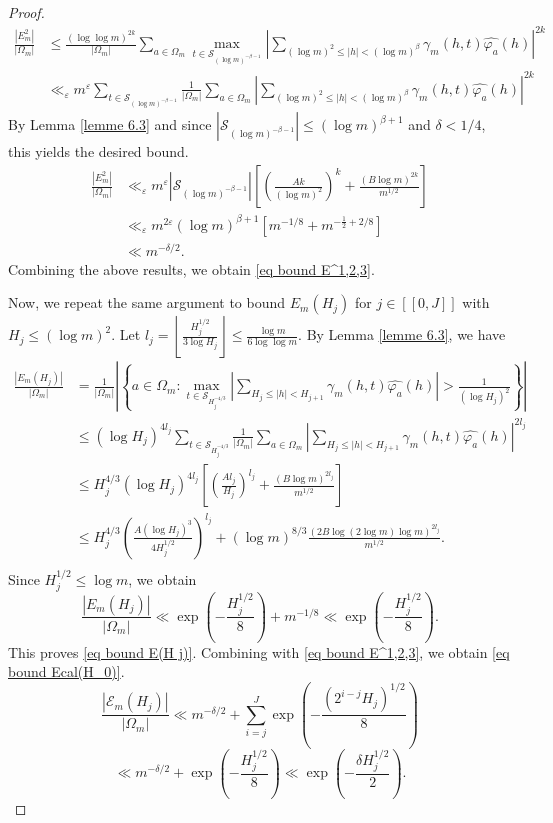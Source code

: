 \documentclass[12pt]{amsart}
\theoremstyle{definition}
\numberwithin{equation}{section}
\numberwithin{equation}{section}
\def\Ecal{\mathcal{E}}
\def\Scal{\mathcal{S}}
\begin{document}
\begin{proof}
\begin{align*}
\frac{| E^2_m|}{|\Omega_m|}
&\leq \frac{(\log\log m)^{2k}}{|\Omega_m|}
\sum_{a\in \Omega_m}
\max _{t\in \Scal_{(\log m)^{-\beta-1}}}\left|
\sum_{(\log m)^{2}\leq |h|< (\log m)^{\beta}}
\gamma_m(h,t)\widehat{\varphi_a}(h)
\right|^{2k} \\
&\ll_\varepsilon m^\varepsilon \sum_{t\in \Scal_{(\log m)^{-\beta-1}}} \frac{1}{|\Omega_m|}\sum_{a\in \Omega_m}
\left|
\sum_
{(\log m)^{2}\leq |h|< (\log m)^{\beta}}
\gamma_m(h,t)\widehat{\varphi_a}(h)
\right|^{2k}
\end{align*}
By Lemma \ref{lemme 6.3} and since \( |\Scal_{(\log m)^{-\beta-1}}| \leq (\log m)^{\beta+1} \) and \(\delta < 1/4\), this yields the desired bound.
\begin{align*}
\frac{| E^2_m|}{|\Omega_m|}
&\ll_\varepsilon m^\varepsilon |\Scal_{(\log m)^{-\beta-1}}|
\left[ 
\left(
\frac{A k}{(\log m)^{2}}
\right)^k
+\frac{(B\log m)^{2k}}{m^{1/2}}\right] \\
&
\ll_\varepsilon m^{2\varepsilon} (\log m)^{\beta+1}
\left[m^{-1/8}+m^{-\frac{1}{2}+2/8}
\right] \\
&\ll m^{-\delta/2}.
\end{align*}
Combining the above results, we obtain \eqref{eq bound E^1,2,3}.

Now, we repeat the same argument to bound $E_m(H_j)$ for $ j \in [\![ 0,J ]\!]  $ with $H_j\leq (\log m)^2.$ Let 
$ l_j = \left\lfloor\frac{H_j^{1/2}}{3\log H_j}
\right\rfloor\leq \frac{\log m}{6\log\log m}.$ By Lemma \ref{lemme 6.3}, we have
\begin{align*}
\frac{| E_m(H_j)|}{|\Omega_m|} &= 
\frac{1}{|\Omega_m|}\left| \left\{
a \in  \Omega_m: 
\max _{t\in \Scal_{H_j^{-4/3}}} 
\left|\sum_{H_j \leq |h|< H_{j+1}} \gamma_m(h,t)\widehat{\varphi_a}(h)\right|
> \frac{1}{(\log H_j)^2}
\right\}\right|
\\
&\leq 
(\log H_j)^{4l_j}
\sum_{t\in \Scal_{H_j^{-4/3}}}
\frac{1}{|\Omega_m|}\sum_{a\in \Omega_m}
\left|
\sum_{H_j \leq |h|< H_{j+1}}
\gamma_m(h,t)\widehat{\varphi_a}(h)
\right|^{2l_j} \\
&\leq  
H_j^{4/3} (\log H_j)^{4l_j}\left[
\left(
\frac{A l_j}{H_j}
\right)^{l_j}
+\frac{(B\log m)^{2l_j}}{m^{1/2}}\right]\\
&\leq H_j^{4/3}
\left(
\frac{A(\log H_j)^3}{4H_j^{1/2}}
\right)^{l_j}
+(\log m)^{8/3}\frac{(2B\log(2\log m)\log m)^{2l_j}}{m^{1/2}}.\\
\end{align*}
Since $ H_j^{1/2}\leq \log m $, we obtain
\[
\frac{| E_m(H_j)|}{|\Omega_m|}
\ll  \exp\left(-\frac{H_j^{1/2}}{8}\right)+
m^{-1/8}\ll 
\exp\left(-\frac{H_j^{1/2}}{8}\right).
\]
This proves \eqref{eq bound E(H j)}. Combining with \eqref{eq bound E^1,2,3}, we obtain \eqref{eq bound Ecal(H_0)}.
\[
\frac{|\Ecal_m(H_j)|}{|\Omega_m|} 
\ll m^{-\delta /2}+
\sum_{i=j}^{J}\exp\left(-\frac{(2^{i-j} H_j)^{1/2}}{8}\right)\]\[
\ll
m^{-\delta /2}
+\exp\left(-\frac{H_j^{1/2}}{8}\right)
\ll
\exp\left(-\frac{\delta H_j^{1/2}}{2}\right).
\]

\end{proof}
\end{document}
